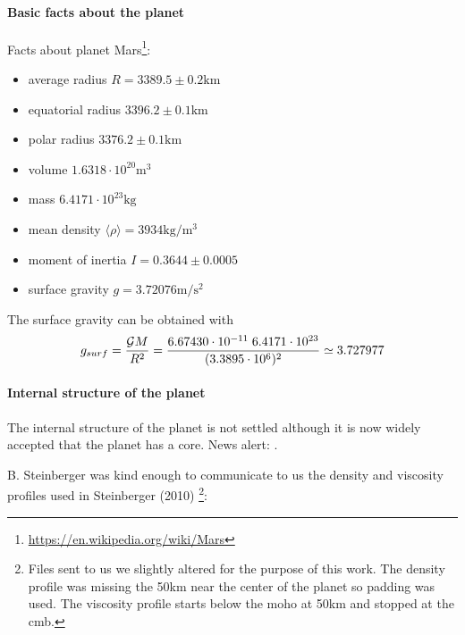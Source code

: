 

\paragraph{Basic facts about the planet}

Facts about planet Mars\footnote{\url{https://en.wikipedia.org/wiki/Mars}}:
\begin{itemize}
\item average radius $R=3389.5 \pm 0.2 \si{\km}$
\item equatorial radius $3396.2 \pm 0.1 \si{\km}$
\item polar radius $3376.2 \pm 0.1 \si{\km}$
\item volume $1.6318 \cdot 10^{20} \si{\cubic\metre}$
\item mass $6.4171 \cdot 10^{23}\si{\kilo\gram}$
\item mean density $\langle\rho\rangle= 3934\si{\kilo\gram\per\cubic\meter}$
\item moment of inertia $I=0.3644 \pm 0.0005$
\item surface gravity $g=3.72076 \si{\metre\per\square\second}$
\end{itemize}

The surface gravity can be obtained with 
\[
g_{surf}=\frac{{\cal G} M}{R^2} 
=\frac{6.67430 \cdot 10^{-11} \; 6.4171 \cdot 10^{23} }{(3.3895\cdot 10^6)^2}
\simeq 3.727977
\]

\paragraph{Internal structure of the planet}

The internal structure of the planet is not settled although 
it is now widely accepted that the planet has a core. News alert: \cite{khcv21,stkb21,knpb21}. 

B. Steinberger was kind enough to communicate to us the density and viscosity 
profiles used in Steinberger \etal (2010) \cite{stwt10} \footnote{Files sent to us 
we slightly altered for the purpose of this work. The density profile was missing 
the 50km near the center of the planet so padding was used. The viscosity profile 
starts below the moho at 50\si{\km} and stopped at the cmb.}:

